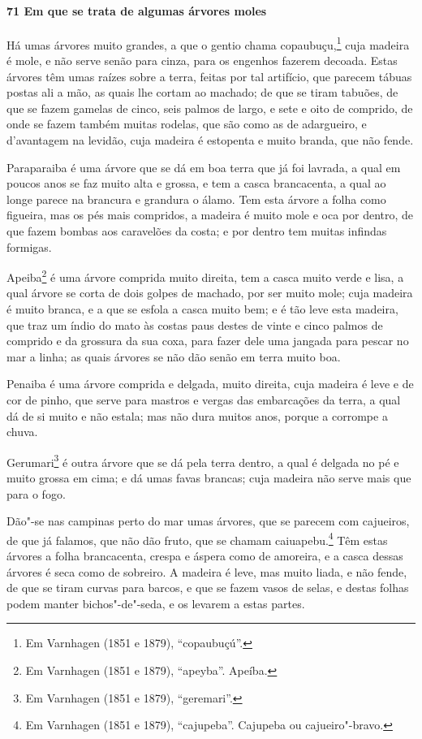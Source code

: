 \begin{linenumbers}
\paragraph{71 Em que se trata de algumas árvores moles}\quad
Há umas árvores muito grandes, a que o gentio chama copaubuçu,\footnote{ Em Varnhagen
(1851 e 1879), ``copaubuçú''.} cuja madeira é mole, e não serve senão para cinza, para os
engenhos fazerem decoada. Estas árvores têm umas raízes sobre a terra, feitas por tal
artifício, que parecem tábuas postas ali a mão, as quais lhe cortam ao machado; de que se
tiram tabuões, de que se fazem gamelas de cinco, seis palmos de largo, e sete e oito de
comprido, de onde se fazem também muitas rodelas, que são como as de adargueiro, e
d'avantagem na levidão, cuja madeira é estopenta e muito branda, que não fende.

Paraparaiba é uma árvore que se dá em boa terra que já foi lavrada, a qual em poucos anos
se faz muito alta e grossa, e tem a casca brancacenta, a qual ao longe parece na brancura
e grandura o álamo. Tem esta árvore a folha como figueira, mas os pés mais compridos, a
madeira é muito mole e oca por dentro, de que fazem bombas aos caravelões da costa; e por
dentro tem muitas infindas formigas.

Apeiba\footnote{ Em Varnhagen (1851 e 1879), ``apeyba''. Apeíba.} é uma árvore comprida
muito direita, tem a casca muito verde e lisa, a qual árvore se corta de dois golpes de
machado, por ser muito mole; cuja madeira é muito branca, e a que se esfola a casca muito
bem; e é tão leve esta madeira, que traz um índio do mato às costas paus destes de vinte e
cinco palmos de comprido e da grossura da sua coxa, para fazer dele uma jangada para
pescar no mar a linha; as quais árvores se não dão senão em terra muito boa.

Penaiba é uma árvore comprida e delgada, muito direita, cuja madeira é leve e de cor de
pinho, que serve para mastros e vergas das embarcações da terra, a qual dá de si muito e
não estala; mas não dura muitos anos, porque a corrompe a chuva.

Gerumari\footnote{ Em Varnhagen (1851 e 1879), ``geremari''.} é outra árvore que se dá
pela terra dentro, a qual é delgada no pé e muito grossa em cima; e dá umas favas brancas;
cuja madeira não serve mais que para o fogo.

Dão"-se nas campinas perto do mar umas árvores, que se parecem com cajueiros, de que já
falamos, que não dão fruto, que se chamam caiuapebu.\footnote{ Em Varnhagen (1851 e 1879),
``cajupeba''. Cajupeba ou cajueiro"-bravo.} Têm estas árvores a folha brancacenta, crespa e
áspera como de amoreira, e a casca dessas árvores é seca como de sobreiro. A madeira é
leve, mas muito liada, e não fende, de que se tiram curvas para barcos, e que se fazem
vasos de selas, e destas folhas podem manter bichos"-de"-seda, e os levarem a estas partes.


\end{linenumbers}
